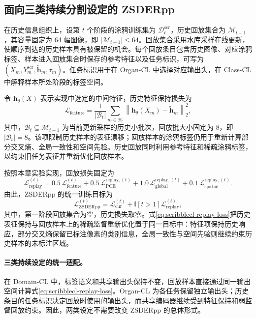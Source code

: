 \subsection{面向三类持续分割设定的 ZSDERpp}
\label{subsec:scribblecl-methods}

在历史信息组织上，设第 $t$ 个阶段的涂鸦训练集为 $\mathcal{D}^{\mathrm{scr}}_t$，历史回放集合为 $\mathcal{M}_{t-1}$，其容量固定为 64 幅图像，即 $|\mathcal{M}_{t-1}|\leq 64$。回放集合采用水库采样在线更新，使顺序到达的历史样本具有被保留的机会。每个回放条目包含历史图像、对应涂鸦标签、样本进入回放集合时保存的参考特征以及任务标识，可写为
$(X_m,Y_m^{\mathrm{scr}},\widetilde{\mathbf h}_m,\tau_m)$。任务标识用于在 Organ-CL 中选择对应输出头，在 Class-CL 中解释样本所处阶段的标签空间。

令 $\mathbf h_{\theta}(X)$ 表示实现中选定的中间特征，历史特征保持损失为
\begin{equation}
\mathcal{L}_{\mathrm{feature}}
=
\frac{1}{|\mathcal{B}_t|}
\sum_{m\in\mathcal{B}_t}
\left\|
\mathbf h_{\theta}(X_m)-\widetilde{\mathbf h}_m
\right\|_2^2,
\label{eq:scribblecl-feature-loss}
\end{equation}
其中，$\mathcal{B}_t\subseteq\mathcal{M}_{t-1}$ 为当前更新采样的历史小批次，回放批大小固定为 8，即 $|\mathcal{B}_t|=8$。该项限制历史样本的表征漂移；回放样本的涂鸦标签仍用于重新计算部分交叉熵、全局一致性和空间先验。历史回放同时利用参考特征和稀疏涂鸦标签，以约束旧任务表征并重新优化回放样本。

按照本章实验实现，回放损失固定为
\begin{equation}
\mathcal{L}_{\mathrm{replay}}^{(t)}
=
0.5\,\mathcal{L}_{\mathrm{feature}}^{(t)}
+
0.5\,\mathcal{L}_{\mathrm{PCE}}^{\mathrm{replay},(t)}
+
1.0\,\mathcal{L}_{\mathrm{global}}^{\mathrm{replay},(t)}
+
0.1\,\mathcal{L}_{\mathrm{spatial}}^{\mathrm{replay},(t)}.
\label{eq:scribblecl-replay-loss}
\end{equation}
由此，ZSDERpp 的统一训练目标为
\begin{equation}
\mathcal{L}_{\mathrm{ZSDERpp}}^{(t)}
=
\mathcal{L}_{\mathrm{cur}}^{(t)}
+
\mathbb{I}[t>1]\mathcal{L}_{\mathrm{replay}}^{(t)},
\label{eq:scribblecl-zsderpp-total}
\end{equation}
其中，第一阶段回放集合为空，历史损失取零。式\eqref{eq:scribblecl-replay-loss}把历史表征保持与回放样本上的稀疏监督重新优化置于同一目标中：特征项保持历史响应，部分交叉熵保留已标注像素的类别信息，全局一致性与空间先验则继续约束历史样本的未标注区域。

\paragraph{三类持续设定的统一适配。}
在 Domain-CL 中，标签语义和共享输出头保持不变，回放样本直接通过同一输出空间计算式\eqref{eq:scribblecl-replay-loss}。Organ-CL 为各任务保留独立输出头；历史条目的任务标识决定回放时使用的输出头，而共享编码器继续受到特征保持和弱监督回放约束。因此，两类设定不需要改变 ZSDERpp 的总体形式。

